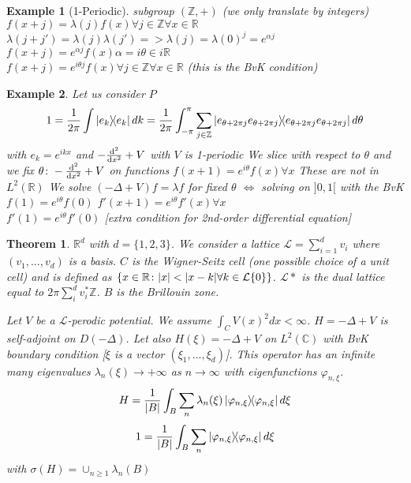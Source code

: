 \documentclass{article}
\newtheorem*{theorem}{Theorem}
\newtheorem*{example}{Example}
\newcommand{\ZZ}{\mathbb{Z}}
\newcommand{\RR}{\mathbb{R}}
\newcommand{\CC}{\mathbb{C}}
\newcommand{\cL}{\mathcal{L}}
\newcommand{\sig}{\sigma}
\newcommand{\la}{\lambda}
\begin{document}
\begin{example}[1-Periodic]
    subgroup $(\ZZ,+)$ (we only translate by integers)\\
    $f(x+j) = \la(j)f(x) \forall j \in \ZZ \forall x \in \RR$\\
    $\la(j+j') = \la(j)\la(j') => \la(j) = \la(0)^j = e^{\alpha j}$\\
    $f(x+j) = e^{\alpha j} f(x)   \alpha = i \theta \in i\RR$\\
    $f(x+j) = e^{i\theta j} f(x) \forall j \in \ZZ \forall x \in \RR$  (this is the BvK condition)\\
\end{example}

\begin{example} 
  Let us consider $P$
  $$ 1 = \frac{1}{2\pi} \int \dyad{e_k}{e_k} dk
      = \frac{1}{2\pi} \int_{-\pi}^{\pi} \sum_{j\in\ZZ} \dyad{e_{\theta+2\pi j}{e_{\theta+2\pi j}}}   d\theta $$
  with $e_k = e^{ikx}$ and $- \dv[2]{}{x} + V$ with $V$ is 1-periodic
  We slice with respect to $\theta$ and we fix $\theta \colon - \dv[2]{}{x} + V$ on functions $f(x+1) = e^{i\theta} f(x) \forall x$
  These are not in $L^2(\RR)$
  We solve $(-\Delta+V)f = \la f$ for fixed $\theta$
  $\Leftrightarrow$ solving on $]0,1[$ with the BvK $f(1) = e^{i\theta} f(0)$
  $f'(x+1) = e^{i\theta} f'(x) \forall x$\\
  $f'(1) = e^{i\theta}f'(0)$ [extra condition for 2nd-order differential equation]
\end{example} 

\begin{theorem} 
  $\RR^d$ with $d=\{1,2,3\}$. 
  We consider a lattice $\cL = \sum_{i=1}^d v_i$ where $(v_1,...,v_d)$ is a basis.
  $C$ is the Wigner-Seitz cell (one possible choice of a unit cell) and is defined as $\qty{ x \in \RR \colon \abs{x} < \abs{x - k} \forall k \in \cL\{0\} }$.
  $\cL*$ is the dual lattice equal to $2\pi \sum_i^d v_i^* \ZZ$.
  $B$ is the Brillouin zone.

  Let $V$ be a $\cL$-perodic potential. We assume $\int_C V(x)^2 dx < \infty$.
  $H = -\Delta + V$ is self-adjoint on $D(-\Delta)$.
  Let also $H(\xi) = -\Delta + V$ on $L^2(\CC)$ with BvK boundary condition [$\xi$ is a vector $(\xi_1,...,\xi_d)$].
  This operator has an infinite many eigenvalues $\la_n(\xi) \to + \infty$ as $ n\to\infty$ with eigenfunctions $\varphi_{n,\xi}$.
  $$ H = \frac{1}{\abs{B}} \int_B \sum_n \la_n(\xi) \dyad{\varphi_{n,\xi}} d\xi $$
  $$ 1 = \frac{1}{\abs{B}} \int_B \sum_n \dyad{\varphi_{n,\xi}} d\xi $$
  with $ \sig(H) = \cup_{n \ge 1} \la_n(B)$
\end{theorem} 
\end{document}

